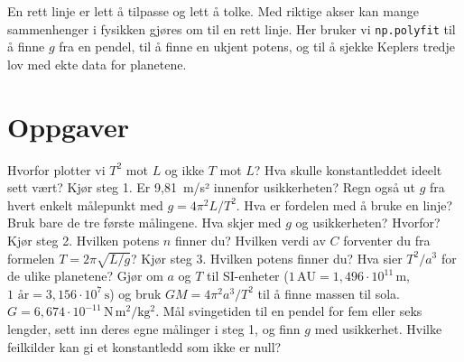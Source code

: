 \documentclass[11pt]{article}
\begin{document}

En rett linje er lett å tilpasse og lett å tolke. Med riktige akser kan mange sammenhenger i fysikken gjøres om til en rett linje. Her bruker vi \texttt{np.polyfit} til å finne $g$ fra en pendel, til å finne en ukjent potens, og til å sjekke Keplers tredje lov med ekte data for planetene.

\section*{Oppgaver}

\begin{oppgaveliste}
\oppgave {}Hvorfor plotter vi $T^{2}$ mot $L$ og ikke $T$ mot $L$? Hva skulle konstantleddet ideelt sett vært?
\svar
\oppgave {}Kjør steg 1. Er 9,81~m/s² innenfor usikkerheten? Regn også ut $g$ fra hvert enkelt målepunkt med $g = 4π^{2}L/T^{2}$. Hva er fordelen med å bruke en linje?
\svar
\oppgave {}Bruk bare de tre første målingene. Hva skjer med $g$ og usikkerheten? Hvorfor?
\svar
\oppgave {}Kjør steg 2. Hvilken potens $n$ finner du? Hvilken verdi av $C$ forventer du fra formelen $T = 2π\sqrt{L/g}$?
\svar
\oppgave {}Kjør steg 3. Hvilken potens finner du? Hva sier $T^{2}/a^{3}$ for de ulike planetene?
\svar
\oppgave {}Gjør om $a$ og $T$ til SI-enheter ($1\,\mathrm{AU} = 1{,}496 \cdot 10^{11}\,\mathrm{m}$, $1\text{ år} = 3{,}156 \cdot 10^{7}\,\mathrm{s}$) og bruk $GM = 4π^{2}a^{3}/T^{2}$ til å finne massen til sola. $G = 6{,}674 \cdot 10^{-11}\,\mathrm{N\,m^{2}/kg^{2}}$.
\svar
\oppgave {}Mål svingetiden til en pendel for fem eller seks lengder, sett inn deres egne målinger i steg 1, og finn $g$ med usikkerhet. Hvilke feilkilder kan gi et konstantledd som ikke er null?
\svar
\end{oppgaveliste}
\end{document}
